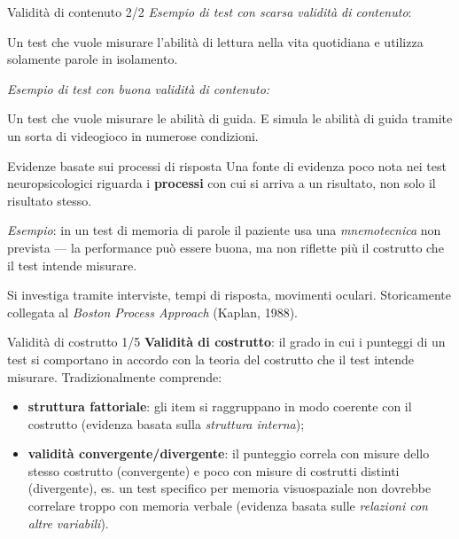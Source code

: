 \documentclass[
  ignorenonframetext,
  aspectratio=169,
]{beamer}
\providecommand{\tightlist}{%
  \setlength{\itemsep}{0pt}\setlength{\parskip}{0pt}}
\begin{document}
\begin{frame}{Validità di contenuto 2/2}
\label{validituxe0-di-contenuto-22}
\emph{Esempio di test con scarsa validità di contenuto}:

Un test che vuole misurare l'abilità di lettura nella vita quotidiana e
utilizza solamente parole in isolamento.

\vfill

\emph{Esempio di test con buona validità di contenuto:}

Un test che vuole misurare le abilità di guida. E simula le abilità di
guida tramite un sorta di videogioco in numerose condizioni.
\end{frame}

\begin{frame}{Evidenze basate sui processi di risposta}
\label{evidenze-basate-sui-processi-di-risposta}
Una fonte di evidenza poco nota nei test neuropsicologici riguarda i
\textbf{processi} con cui si arriva a un risultato, non solo il
risultato stesso.

\emph{Esempio}: in un test di memoria di parole il paziente usa una
\emph{mnemotecnica} non prevista --- la performance può essere buona, ma
non riflette più il costrutto che il test intende misurare.

\vfill

Si investiga tramite interviste, tempi di risposta, movimenti oculari.
Storicamente collegata al \emph{Boston Process Approach} (Kaplan, 1988).
\end{frame}

\begin{frame}{Validità di costrutto 1/5}
\label{validituxe0-di-costrutto-15}
\textbf{Validità di costrutto}: il grado in cui i punteggi di un test si
comportano in accordo con la teoria del costrutto che il test intende
misurare. Tradizionalmente comprende:

\begin{itemize}
\tightlist
\item
  \textbf{struttura fattoriale}: gli item si raggruppano in modo
  coerente con il costrutto (evidenza basata sulla \emph{struttura
  interna});
\item
  \textbf{validità convergente/divergente}: il punteggio correla con
  misure dello stesso costrutto (convergente) e poco con misure di
  costrutti distinti (divergente), es. un test specifico per memoria
  visuospaziale non dovrebbe correlare troppo con memoria verbale
  (evidenza basata sulle \emph{relazioni con altre variabili}).
\end{itemize}
\end{frame}
\end{document}
